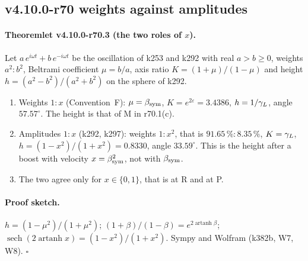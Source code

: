\subsection*{v4.10.0-r70 weights against amplitudes}
\label{subsec:v4100-r70-weights}

\paragraph{Theoremlet v4.10.0-r70.3 (the two roles of \(x\)).}
Let \(a\,e^{i\omega t}+b\,e^{-i\omega t}\) be the oscillation of k253 and k292 with real \(a>b\ge0\), weights \(a^2:b^2\), Beltrami coefficient
\(\mu=b/a\), axis ratio \(K=(1+\mu)/(1-\mu)\) and height \(h=(a^2-b^2)/(a^2+b^2)\) on the sphere of k292.
\begin{enumerate}[leftmargin=2em]
\item[(a)] Weights \(1:x\) (Convention~F): \(\mu=\beta_{\mathrm{sym}}\), \(K=e^{2\varepsilon}=3.4386\), \(h=1/\gamma_L\), angle \(57.57^\circ\).  The height is that of
M in r70.1(c).
\item[(b)] Amplitudes \(1:x\) (k292, k297): weights \(1:x^2\), that is \(91.65\,\%:8.35\,\%\), \(K=\gamma_L\), \(h=(1-x^2)/(1+x^2)=0.8330\), angle
\(33.59^\circ\).  This is the height after a boost with velocity \(x=\beta_{\mathrm{sym}}^2\), not with \(\beta_{\mathrm{sym}}\).
\item[(c)] The two agree only for \(x\in\{0,1\}\), that is at R and at P.
\end{enumerate}

\paragraph{Proof sketch.}
\(h=(1-\mu^2)/(1+\mu^2)\); \((1+\beta)/(1-\beta)=e^{2\operatorname{artanh}\beta}\); \(\operatorname{sech}(2\operatorname{artanh}x)=(1-x^2)/(1+x^2)\).
Sympy and Wolfram (k382b, W7, W8).  \(\square\)

